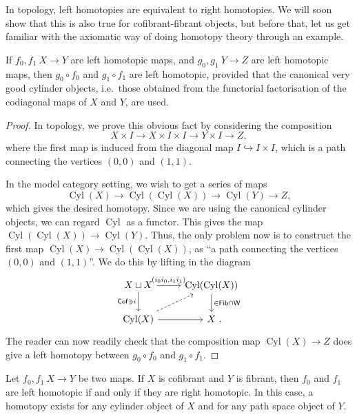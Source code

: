 In topology, left homotopies are equivalent to right homotopies.
We will soon show that this is also true
for cofibrant-fibrant objects,
but before that,
let us get familiar with the axiomatic way of doing homotopy theory
through an example.

\begin{example}
    If $f_0,f_1\:X\to Y$ are left homotopic maps,
    and $g_0,g_1\:Y\to Z$ are left homotopic maps,
    then $g_0\circ f_0$ and $g_1\circ f_1$ are left homotopic,
    provided that the canonical very good cylinder objects,
    i.e.\ those obtained from the functorial factorisation
    of the codiagonal maps of $X$ and $Y$,
    are used.
\end{example}

\begin{proof}
    In topology, we prove this obvious fact by considering the composition
    \[ X\times I\to X\times I\times I\to Y\times I\to Z, \]
    where the first map is induced from the diagonal map $I\hookrightarrow I\times I$,
    which is a path connecting the vertices $(0,0)$ and $(1,1)$.

    In the model category setting,
    we wish to get a series of maps
    \[ \operatorname{Cyl}(X)\to\operatorname{Cyl}(\operatorname{Cyl}(X))\to \operatorname{Cyl}(Y)\to Z, \]
    which gives the desired homotopy.
    Since we are using the canonical cylinder objects,
    we can regard $\operatorname{Cyl}$ as a functor.
    This gives the map $\operatorname{Cyl}(\operatorname{Cyl}(X))\to \operatorname{Cyl}(Y)$.
    Thus, the only problem now is to construct the first map
    $\operatorname{Cyl}(X)\to\operatorname{Cyl}(\operatorname{Cyl}(X))$,
    as ``a path connecting the vertices $(0,0)$ and $(1,1)$''.
    We do this by lifting in the diagram
    \[ \begin{tikzcd}
        X\sqcup X\ar[d,"\cat{Cof}\ni i"']\ar[r,"(i_0i_0\comma i_1i_1)"] & 
        \operatorname{Cyl}(\operatorname{Cyl}(X))\ar[d,"\in\cat{Fib}\cap\cat{W}"] \\
        \operatorname{Cyl}(X)\ar[r]\ar[ru,dashed] & X\rlap{\ .}
    \end{tikzcd} \]
    The reader can now readily check that
    the composition map $\operatorname{Cyl}(X)\to Z$
    does give a left homotopy between $g_0\circ f_0$ and $g_1\circ f_1$.
\end{proof}

\begin{proposition}
    Let $f_0,f_1\:X\to Y$ be two maps.
    If $X$ is cofibrant and $Y$ is fibrant, then
    $f_0$ and $f_1$ are left homotopic if and only if they are right homotopic.
    In this case, a homotopy exists
    for any cylinder object of $X$ and
    for any path space object of $Y$.
\end{proposition}

